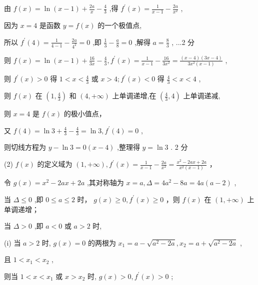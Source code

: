 \documentclass[10pt]{article}
\newcommand*\circled[1]{\tikz[baseline=(char.base)]{\node[shape=circle,draw,inner sep=1.5pt] (char) {\small #1};}}
\begin{document}
由 \(f\left( x\right)  = \ln \left( {x - 1}\right)  + \frac{2a}{x} - \frac{4}{3}\) ,得 \({f}^{\prime }\left( x\right)  = \frac{1}{x - 1} - \frac{2a}{{x}^{2}}\) ,

因为 \(x = 4\) 是函数 \(y = f\left( x\right)\) 的一个极值点,

所以 \({f}^{\prime }\left( 4\right)  = \frac{1}{4 - 1} - \frac{2a}{{4}^{2}} = 0\) ,即 \(\frac{1}{3} - \frac{a}{8} = 0\) ,解得 \(a = \frac{8}{3}\) , ...2 分

则 \(f\left( x\right)  = \ln \left( {x - 1}\right)  + \frac{16}{3x} - \frac{4}{3},{f}^{\prime }\left( x\right)  = \frac{1}{x - 1} - \frac{16}{3{x}^{2}} = \frac{\left( {x - 4}\right) \left( {{3x} - 4}\right) }{3{x}^{2}\left( {x - 1}\right) }\) ,

则 \({f}^{\prime }\left( x\right)  > 0\) 得 \(1 < x < \frac{4}{3}\) 或 \(x > 4;{f}^{\prime }\left( x\right)  < 0\) 得 \(\frac{4}{3} < x < 4\) ,

则 \(f\left( x\right)\) 在 \(\left( {1,\frac{4}{3}}\right)\) 和 \(\left( {4, + \infty }\right)\) 上单调递增,在 \(\left( {\frac{4}{3},4}\right)\) 上单调递减,

则 \(x = 4\) 是 \(f\left( x\right)\) 的极小值点，

又 \(f\left( 4\right)  = \ln 3 + \frac{4}{3} - \frac{4}{3} = \ln 3,{f}^{\prime }\left( 4\right)  = 0\) ,

则切线方程为 \(y - \ln 3 = 0\left( {x - 4}\right)\) ,整理得 \(y = \ln 3\) . 2 分

(2) \(f\left( x\right)\) 的定义域为 \(\left( {1, + \infty }\right) ,{f}^{\prime }\left( x\right)  = \frac{1}{x - 1} - \frac{2a}{{x}^{2}} = \frac{{x}^{2} - {2ax} + {2a}}{{x}^{2}\left( {x - 1}\right) }\) ，

令 \(g\left( x\right)  = {x}^{2} - {2ax} + {2a}\) ,其对称轴为 \(x = a,\Delta  = 4{a}^{2} - {8a} = {4a}\left( {a - 2}\right)\) ,

 \circled{1}  当 \(\Delta  \leq  0\) ,即 \(0 \leq  a \leq  2\) 时， \(g\left( x\right)  \geq  0,{f}^{\prime }\left( x\right)  \geq  0\) ，则 \(f\left( x\right)\) 在 \(\left( {1, + \infty }\right)\) 上单调递增；

 \circled{2} 当 \(\Delta  > 0\) ,即 \(a < 0\) 或 \(a > 2\) 时,

(i) 当 \(a > 2\) 时, \(g\left( x\right)  = 0\) 的两根为 \({x}_{1} = a - \sqrt{{a}^{2} - {2a}},{x}_{2} = a + \sqrt{{a}^{2} - {2a}}\) ,

且 \(1 < {x}_{1} < {x}_{2}\) ,

则当 \(1 < x < {x}_{1}\) 或 \(x > {x}_{2}\) 时, \(g\left( x\right)  > 0,{f}^{\prime }\left( x\right)  > 0\) ;
\end{document}

